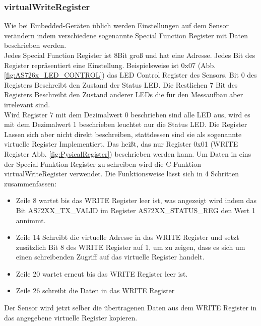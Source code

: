 \subsubsection{virtualWriteRegister}
Wie bei Embedded-Geräten üblich werden Einstellungen auf dem Sensor verändern indem verschiedene sogenannte Special Function Register mit Daten beschrieben werden.\\
Jedes Special Function Register ist 8Bit groß und hat eine Adresse. Jedes Bit des Register repräsentiert eine Einstellung.
Beispielsweise ist 0x07 (Abb. \ref{fig:AS726x_LED_CONTROL}) das LED Control Register des Sensors.
Bit 0 des Registers Beschreibt den Zustand der Status LED.
Die Restlichen 7 Bit des Registers Beschreibt den Zustand anderer LEDs die für den Messaufbau aber irrelevant sind.\\
Wird Register 7 mit dem Dezimalwert 0 beschrieben sind alle LED aus, wird es mit dem Dezimalwert 1 beschrieben leuchtet nur die Status LED.
Die Register Lassen sich aber nicht direkt beschreiben, stattdessen sind sie als sogenannte virtuelle Register Implementiert.
Das heißt, das nur Register 0x01 (WRITE Register Abb. \ref{fig:PysicalRegister}) beschrieben werden kann.
Um Daten in eins der Special Funktion Register zu schreiben wird die C-Funktion virtualWriteRegister verwendet.
Die Funktionsweise lässt sich in 4 Schritten zusammenfassen:
\begin{itemize}
	\item Zeile 8 wartet bis das WRITE Register leer ist, was angezeigt wird indem  das Bit AS72XX\_TX\_VALID im  Register AS72XX\_STATUS\_REG den Wert 1 annimmt.
	\item Zeile 14 Schreibt die virtuelle Adresse in das WRITE Register und setzt zusätzlich Bit 8 des WRITE Register auf 1, um zu zeigen, dass es sich um einen schreibenden Zugriff auf das virtuelle Register handelt.
	\item Zeile 20 wartet erneut bis das WRITE Register leer ist.
	\item Zeile 26 schreibt die Daten in das WRITE Register
\end{itemize}
Der Sensor wird jetzt selber die übertragenen Daten aus dem WRITE Register in das angegebene virtuelle Register kopieren.



